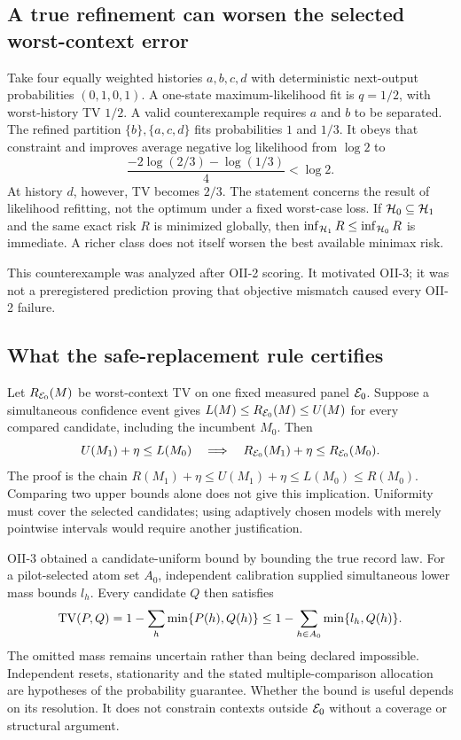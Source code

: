 \subsection{A true refinement can worsen the selected worst-context error}\label{app:likelihood}
Take four equally weighted histories $a,b,c,d$ with deterministic next-output probabilities $(0,1,0,1)$. A one-state maximum-likelihood fit is $q=1/2$, with worst-history TV $1/2$. A valid counterexample requires $a$ and $b$ to be separated. The refined partition $\{b\},\{a,c,d\}$ fits probabilities $1$ and $1/3$. It obeys that constraint and improves average negative log likelihood from $\log2$ to
\begin{equation}
 \frac{-2\log(2/3)-\log(1/3)}{4}<\log2.
\end{equation}
At history $d$, however, TV becomes $2/3$. The statement concerns the result of likelihood refitting, not the optimum under a fixed worst-case loss. If $\mathcal H_0\subseteq\mathcal H_1$ and the same exact risk $R$ is minimized globally, then $\inf_{\mathcal H_1}R\leq\inf_{\mathcal H_0}R$ is immediate. A richer class does not itself worsen the best available minimax risk.

This counterexample was analyzed after OII-2 scoring. It motivated OII-3; it was not a preregistered prediction proving that objective mismatch caused every OII-2 failure.

\subsection{What the safe-replacement rule certifies}\label{app:safe}
Let $R_{\mathcal E_0}(M)$ be worst-context TV on one fixed measured panel $\mathcal E_0$. Suppose a simultaneous confidence event gives $L(M)\leq R_{\mathcal E_0}(M)\leq U(M)$ for every compared candidate, including the incumbent $M_0$. Then
\begin{equation}
 U(M_1)+\eta\leq L(M_0)
 \quad\Longrightarrow\quad
 R_{\mathcal E_0}(M_1)+\eta\leq R_{\mathcal E_0}(M_0).
\end{equation}
The proof is the chain $R(M_1)+\eta\leq U(M_1)+\eta\leq L(M_0)\leq R(M_0)$. Comparing two upper bounds alone does not give this implication. Uniformity must cover the selected candidates; using adaptively chosen models with merely pointwise intervals would require another justification.

OII-3 obtained a candidate-uniform bound by bounding the true record law. For a pilot-selected atom set $A_0$, independent calibration supplied simultaneous lower mass bounds $l_h$. Every candidate $Q$ then satisfies
\begin{equation}\label{eq:atom-upper}
 \operatorname{TV}(P,Q)=1-\sum_h\min\{P(h),Q(h)\}
 \leq 1-\sum_{h\in A_0}\min\{l_h,Q(h)\}.
\end{equation}
The omitted mass remains uncertain rather than being declared impossible. Independent resets, stationarity and the stated multiple-comparison allocation are hypotheses of the probability guarantee. Whether the bound is useful depends on its resolution. It does not constrain contexts outside $\mathcal E_0$ without a coverage or structural argument.


